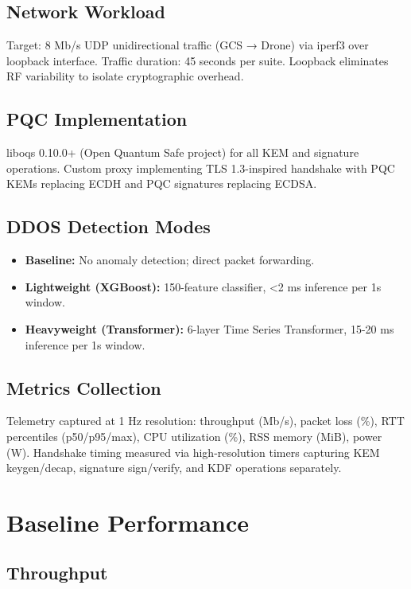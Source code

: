 \documentclass[11pt,a4paper]{article}
\begin{document}
\subsection{Network Workload}
Target: 8 Mb/s UDP unidirectional traffic (GCS → Drone) via iperf3 over loopback interface. Traffic duration: 45 seconds per suite. Loopback eliminates RF variability to isolate cryptographic overhead.

\subsection{PQC Implementation}
liboqs 0.10.0+ (Open Quantum Safe project) for all KEM and signature operations. Custom proxy implementing TLS 1.3-inspired handshake with PQC KEMs replacing ECDH and PQC signatures replacing ECDSA.

\subsection{DDOS Detection Modes}
\begin{itemize}
    \item \textbf{Baseline:} No anomaly detection; direct packet forwarding.
    \item \textbf{Lightweight (XGBoost):} 150-feature classifier, <2 ms inference per 1s window.
    \item \textbf{Heavyweight (Transformer):} 6-layer Time Series Transformer, 15-20 ms inference per 1s window.
\end{itemize}

\subsection{Metrics Collection}
Telemetry captured at 1 Hz resolution: throughput (Mb/s), packet loss (\%), RTT percentiles (p50/p95/max), CPU utilization (\%), RSS memory (MiB), power (W). Handshake timing measured via high-resolution timers capturing KEM keygen/decap, signature sign/verify, and KDF operations separately.

\section{Baseline Performance}

\subsection{Throughput}
\end{document}
